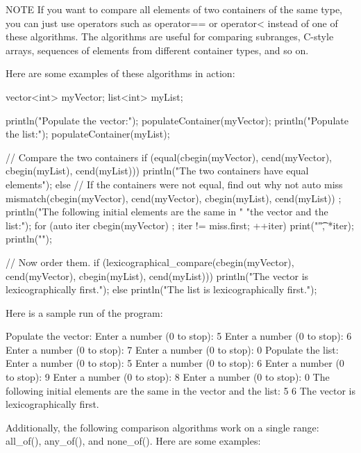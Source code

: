 \begin{myNotic}{NOTE}
If you want to compare all elements of two containers of the same type, you can just use operators such as operator== or operator< instead of one of these algorithms. The algorithms are useful for comparing subranges, C-style arrays, sequences of elements from different container types, and so on.
\end{myNotic}

Here are some examples of these algorithms in action:

\begin{cpp}
vector<int> myVector;
list<int> myList;

println("Populate the vector:");
populateContainer(myVector);
println("Populate the list:");
populateContainer(myList);

// Compare the two containers
if (equal(cbegin(myVector), cend(myVector),
          cbegin(myList), cend(myList))) {
    println("The two containers have equal elements");
} else {
    // If the containers were not equal, find out why not
    auto miss { mismatch(cbegin(myVector), cend(myVector),
        cbegin(myList), cend(myList)) };
    println("The following initial elements are the same in "
        "the vector and the list:");
    for (auto iter { cbegin(myVector) }; iter != miss.first; ++iter) {
        print("{}\t", *iter);
    }
    println("");
}

// Now order them.
if (lexicographical_compare(cbegin(myVector), cend(myVector),
cbegin(myList), cend(myList))) {
    println("The vector is lexicographically first.");
} else {
    println("The list is lexicographically first.");
}
\end{cpp}

Here is a sample run of the program:

\begin{shell}
Populate the vector:
Enter a number (0 to stop): 5
Enter a number (0 to stop): 6
Enter a number (0 to stop): 7
Enter a number (0 to stop): 0
Populate the list:
Enter a number (0 to stop): 5
Enter a number (0 to stop): 6
Enter a number (0 to stop): 9
Enter a number (0 to stop): 8
Enter a number (0 to stop): 0
The following initial elements are the same in the vector and the list:
5 6
The vector is lexicographically first.
\end{shell}

Additionally, the following comparison algorithms work on a single range: all\_of(), any\_of(), and none\_of(). Here are some examples:


